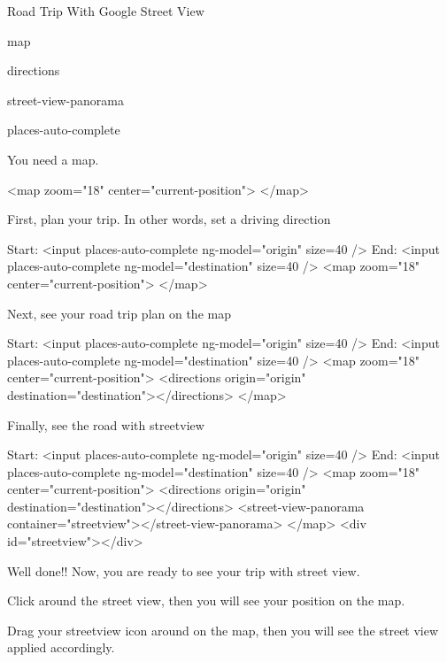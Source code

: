 Road Trip With Google Street View


\begin{DoxyEnumerate}
\item map
\item directions
\item street-\/view-\/panorama
\item places-\/auto-\/complete
\end{DoxyEnumerate}

You need a map. \begin{DoxyVerb}<map zoom="18" center="current-position">
</map>
\end{DoxyVerb}


First, plan your trip. In other words, set a driving direction \begin{DoxyVerb}Start: <input places-auto-complete ng-model="origin" size=40 />    
End:   <input places-auto-complete ng-model="destination" size=40 />
<map zoom="18" center="current-position">
</map>
\end{DoxyVerb}


Next, see your road trip plan on the map \begin{DoxyVerb}Start: <input places-auto-complete ng-model="origin" size=40 />    
End:   <input places-auto-complete ng-model="destination" size=40 />
<map zoom="18" center="current-position">
  <directions origin="{{origin}}" destination="{{destination}}"></directions>
</map>
\end{DoxyVerb}


Finally, see the road with streetview \begin{DoxyVerb}Start: <input places-auto-complete ng-model="origin" size=40 />    
End:   <input places-auto-complete ng-model="destination" size=40 />
<map zoom="18" center="current-position">
  <directions origin="{{origin}}" destination="{{destination}}"></directions>
  <street-view-panorama container="streetview"></street-view-panorama> 
</map>
<div id="streetview"></div> 
\end{DoxyVerb}


Well done!! Now, you are ready to see your trip with street view.
\begin{DoxyEnumerate}
\item Click around the street view, then you will see your position on the map.
\item Drag your streetview icon around on the map, then you will see the street view applied accordingly.
\end{DoxyEnumerate}

